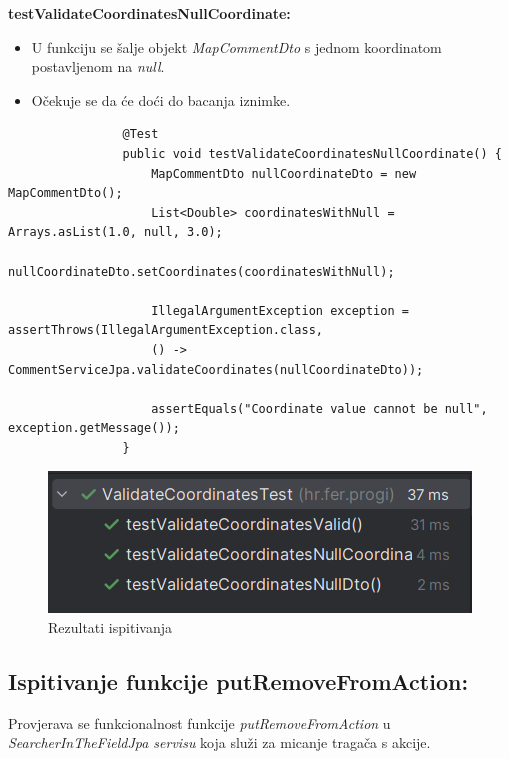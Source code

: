 			\textbf{testValidateCoordinatesNullCoordinate:}
			\begin{itemize}
				\item U funkciju se šalje objekt \textit{MapCommentDto} s jednom koordinatom postavljenom na \textit{null}.
				\item Očekuje se da će doći do bacanja iznimke.
			\end{itemize}
			\begin{lstlisting}
				@Test
				public void testValidateCoordinatesNullCoordinate() {
					MapCommentDto nullCoordinateDto = new MapCommentDto();
					List<Double> coordinatesWithNull = Arrays.asList(1.0, null, 3.0);
					nullCoordinateDto.setCoordinates(coordinatesWithNull);
					
					IllegalArgumentException exception = assertThrows(IllegalArgumentException.class,
					() -> CommentServiceJpa.validateCoordinates(nullCoordinateDto));
					
					assertEquals("Coordinate value cannot be null", exception.getMessage());
				}
			\end{lstlisting}
			
			\begin{figure}[H]
				\includegraphics[scale=1]{slike/validateCoordinatesTest.png} 
				\centering
				\caption{Rezultati ispitivanja}
				\label{fig:validateCoordinatesTest}
			\end{figure}
			
			\subsection{Ispitivanje funkcije putRemoveFromAction:}
			Provjerava se funkcionalnost funkcije \textit{putRemoveFromAction} u \textit{SearcherInTheFieldJpa servisu} koja služi za micanje tragača s akcije.
			
